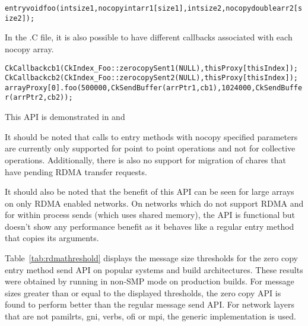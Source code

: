\begin{alltt}
entry void foo (int size1, nocopy int arr1[size1], int size2, nocopy double arr2[size2]);
\end{alltt}

In the .C file, it is also possible to have different callbacks associated with each nocopy array.
\begin{alltt}
CkCallback cb1(CkIndex_Foo::zerocopySent1(NULL), thisProxy[thisIndex]);
CkCallback cb2(CkIndex_Foo::zerocopySent2(NULL), thisProxy[thisIndex]);
arrayProxy[0].foo(500000, CkSendBuffer(arrPtr1, cb1), 1024000, CkSendBuffer(arrPtr2, cb2));
\end{alltt}

This API is demonstrated in 
and 

\vspace{0.1in}
\noindent
It should be noted that calls to entry methods with nocopy specified parameters are
currently only supported for point to point operations and not for collective operations.
Additionally, there is also no support for migration of chares that have pending RDMA transfer
requests.

\vspace{0.1in}
\noindent
It should also be noted that the benefit of this API can be seen for large arrays on
only RDMA enabled networks. On networks which do not support RDMA and for within process sends
(which uses shared memory), the API is functional but doesn't show any performance benefit as it
behaves like a regular entry method that copies its arguments.

Table~\ref{tab:rdmathreshold} displays the message size thresholds for the zero copy entry method
send API on popular systems and build architectures. These results were obtained by running
 in non-SMP mode
on production builds. For message sizes greater than or equal to the displayed thresholds,
the zero copy API is found to perform better than the regular message send API. For network layers
that are not pamilrts, gni, verbs, ofi or mpi, the generic implementation is used.

